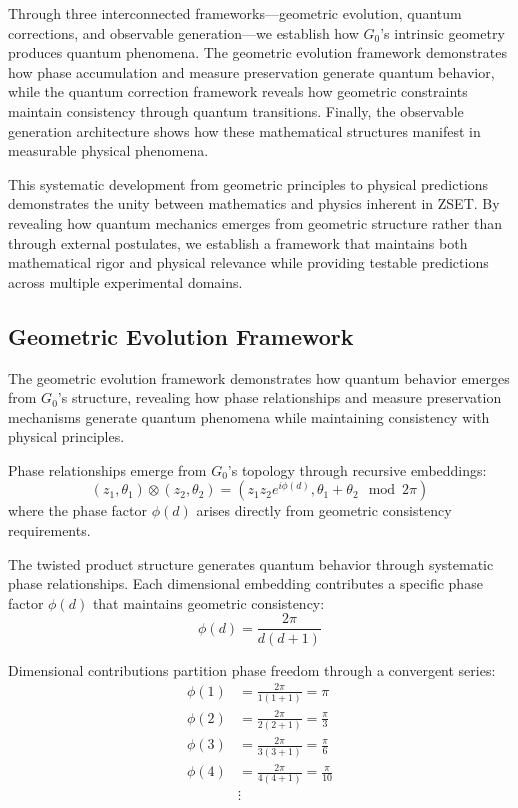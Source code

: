 \documentclass[10pt]{article}
\begin{document}
Through three interconnected frameworks—geometric evolution, quantum corrections, and observable generation—we establish how $G_0$'s intrinsic geometry produces quantum phenomena. The geometric evolution framework demonstrates how phase accumulation and measure preservation generate quantum behavior, while the quantum correction framework reveals how geometric constraints maintain consistency through quantum transitions. Finally, the observable generation architecture shows how these mathematical structures manifest in measurable physical phenomena.

This systematic development from geometric principles to physical predictions demonstrates the unity between mathematics and physics inherent in ZSET. By revealing how quantum mechanics emerges from geometric structure rather than through external postulates, we establish a framework that maintains both mathematical rigor and physical relevance while providing testable predictions across multiple experimental domains.

\subsection{Geometric Evolution Framework}

The geometric evolution framework demonstrates how quantum behavior emerges from $G_0$'s structure, revealing how phase relationships and measure preservation mechanisms generate quantum phenomena while maintaining consistency with physical principles.

Phase relationships emerge from $G_0$'s topology through recursive embeddings:
\[
(z_1, \theta_1) \otimes (z_2, \theta_2) = \left(z_1z_2e^{i\phi(d)}, \theta_1 + \theta_2 \mod 2\pi\right)
\]
where the phase factor $\phi(d)$ arises directly from geometric consistency requirements.

The twisted product structure generates quantum behavior through systematic phase relationships. Each dimensional embedding contributes a specific phase factor $\phi(d)$ that maintains geometric consistency:
\[
\phi(d) = \frac{2\pi}{d(d+1)}
\]

Dimensional contributions partition phase freedom through a convergent series:
\[\begin{aligned}
\phi(1) &= \frac{2\pi}{1(1+1)} = \pi \\
\phi(2) &= \frac{2\pi}{2(2+1)} = \frac{\pi}{3} \\
\phi(3) &= \frac{2\pi}{3(3+1)} = \frac{\pi}{6} \\
\phi(4) &= \frac{2\pi}{4(4+1)} = \frac{\pi}{10} \\
&\vdots
\end{aligned}\]
\end{document}
